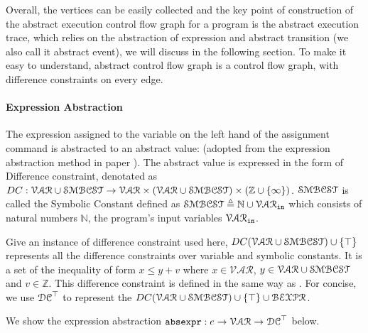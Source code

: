   Overall, the vertices can be easily collected and the key point of construction of the abstract execution control flow graph for a program is the abstract execution trace, 
  which relies on the abstraction of expression and abstract transition (we also call it abstract event), we will discuss in the following section.
   To make it easy to understand, abstract control flow graph is a control flow graph, with difference constraints on every edge.

%
\paragraph*{Expression Abstraction}

The expression assigned to the variable on the left hand of the assignment command is abstracted to an abstract value: (adopted from the expression abstraction method in paper \cite{sinn2017complexity}). The abstract value is expressed in the form of Difference constraint, denotated as $DC : \mathcal{VAR} \cup \mathcal{SMBCST} \to \mathcal{\mathcal{VAR} \times (\mathcal{VAR} \cup \mathcal{SMBCST}) } \times (\mathbb{Z} \cup \{\infty\})$.  $\mathcal{SMBCST}$ is called the Symbolic Constant defined as $\mathcal{SMBCST} \triangleq \mathbb{N} \cup \mathcal{VAR}_{\mathtt{in}}$
which consists of 
natural numbers $\mathbb{N}$,
the program's input variables $\mathcal{VAR}_{\mathtt{in}}$. 

Give an instance of difference constraint used here,
$DC(\mathcal{VAR}  \cup \mathcal{SMBCST}) \cup \{\top\}$ represents all the difference constraints over 
variable and symbolic constants. 
It is a set of the inequality of form $x \leq y + v$ where $x \in \mathcal{VAR} $, 
$y \in \mathcal{VAR}  \cup \mathcal{SMBCST}$ and $v \in \mathbb{Z}$. 
This difference constraint is defined in the same way as
\cite{sinn2017complexity}. For concise, we use $\mathcal{DC}^{\top}$ to represent the $DC(\mathcal{VAR}  \cup \mathcal{SMBCST}) \cup \{\top\} \cup \mathcal{BEXPR}$.

We show the expression abstraction $\mathtt{abs}{\mathtt{expr}} : e \to \mathcal{VAR} \to \mathcal{DC}^{\top} $ below.


